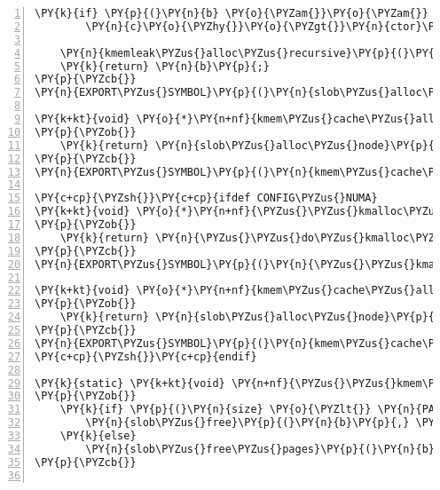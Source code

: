 \begin{Verbatim}[commandchars=\\\{\},numbers=left,firstnumber=1,stepnumber=1]
	\PY{k}{if} \PY{p}{(}\PY{n}{b} \PY{o}{\PYZam{}}\PY{o}{\PYZam{}} \PY{n}{c}\PY{o}{\PYZhy{}}\PY{o}{\PYZgt{}}\PY{n}{ctor}\PY{p}{)}
		\PY{n}{c}\PY{o}{\PYZhy{}}\PY{o}{\PYZgt{}}\PY{n}{ctor}\PY{p}{(}\PY{n}{b}\PY{p}{)}\PY{p}{;}

	\PY{n}{kmemleak\PYZus{}alloc\PYZus{}recursive}\PY{p}{(}\PY{n}{b}\PY{p}{,} \PY{n}{c}\PY{o}{\PYZhy{}}\PY{o}{\PYZgt{}}\PY{n}{size}\PY{p}{,} \PY{l+m+mi}{1}\PY{p}{,} \PY{n}{c}\PY{o}{\PYZhy{}}\PY{o}{\PYZgt{}}\PY{n}{flags}\PY{p}{,} \PY{n}{flags}\PY{p}{)}\PY{p}{;}
	\PY{k}{return} \PY{n}{b}\PY{p}{;}
\PY{p}{\PYZcb{}}
\PY{n}{EXPORT\PYZus{}SYMBOL}\PY{p}{(}\PY{n}{slob\PYZus{}alloc\PYZus{}node}\PY{p}{)}\PY{p}{;}

\PY{k+kt}{void} \PY{o}{*}\PY{n+nf}{kmem\PYZus{}cache\PYZus{}alloc}\PY{p}{(}\PY{k}{struct} \PY{n}{kmem\PYZus{}cache} \PY{o}{*}\PY{n}{cachep}\PY{p}{,} \PY{k+kt}{gfp\PYZus{}t} \PY{n}{flags}\PY{p}{)}
\PY{p}{\PYZob{}}
	\PY{k}{return} \PY{n}{slob\PYZus{}alloc\PYZus{}node}\PY{p}{(}\PY{n}{cachep}\PY{p}{,} \PY{n}{flags}\PY{p}{,} \PY{n}{NUMA\PYZus{}NO\PYZus{}NODE}\PY{p}{)}\PY{p}{;}
\PY{p}{\PYZcb{}}
\PY{n}{EXPORT\PYZus{}SYMBOL}\PY{p}{(}\PY{n}{kmem\PYZus{}cache\PYZus{}alloc}\PY{p}{)}\PY{p}{;}

\PY{c+cp}{\PYZsh{}}\PY{c+cp}{ifdef CONFIG\PYZus{}NUMA}
\PY{k+kt}{void} \PY{o}{*}\PY{n+nf}{\PYZus{}\PYZus{}kmalloc\PYZus{}node}\PY{p}{(}\PY{k+kt}{size\PYZus{}t} \PY{n}{size}\PY{p}{,} \PY{k+kt}{gfp\PYZus{}t} \PY{n}{gfp}\PY{p}{,} \PY{k+kt}{int} \PY{n}{node}\PY{p}{)}
\PY{p}{\PYZob{}}
	\PY{k}{return} \PY{n}{\PYZus{}\PYZus{}do\PYZus{}kmalloc\PYZus{}node}\PY{p}{(}\PY{n}{size}\PY{p}{,} \PY{n}{gfp}\PY{p}{,} \PY{n}{node}\PY{p}{,} \PY{n}{\PYZus{}RET\PYZus{}IP\PYZus{}}\PY{p}{)}\PY{p}{;}
\PY{p}{\PYZcb{}}
\PY{n}{EXPORT\PYZus{}SYMBOL}\PY{p}{(}\PY{n}{\PYZus{}\PYZus{}kmalloc\PYZus{}node}\PY{p}{)}\PY{p}{;}

\PY{k+kt}{void} \PY{o}{*}\PY{n+nf}{kmem\PYZus{}cache\PYZus{}alloc\PYZus{}node}\PY{p}{(}\PY{k}{struct} \PY{n}{kmem\PYZus{}cache} \PY{o}{*}\PY{n}{cachep}\PY{p}{,} \PY{k+kt}{gfp\PYZus{}t} \PY{n}{gfp}\PY{p}{,} \PY{k+kt}{int} \PY{n}{node}\PY{p}{)}
\PY{p}{\PYZob{}}
	\PY{k}{return} \PY{n}{slob\PYZus{}alloc\PYZus{}node}\PY{p}{(}\PY{n}{cachep}\PY{p}{,} \PY{n}{gfp}\PY{p}{,} \PY{n}{node}\PY{p}{)}\PY{p}{;}
\PY{p}{\PYZcb{}}
\PY{n}{EXPORT\PYZus{}SYMBOL}\PY{p}{(}\PY{n}{kmem\PYZus{}cache\PYZus{}alloc\PYZus{}node}\PY{p}{)}\PY{p}{;}
\PY{c+cp}{\PYZsh{}}\PY{c+cp}{endif}

\PY{k}{static} \PY{k+kt}{void} \PY{n+nf}{\PYZus{}\PYZus{}kmem\PYZus{}cache\PYZus{}free}\PY{p}{(}\PY{k+kt}{void} \PY{o}{*}\PY{n}{b}\PY{p}{,} \PY{k+kt}{int} \PY{n}{size}\PY{p}{)}
\PY{p}{\PYZob{}}
	\PY{k}{if} \PY{p}{(}\PY{n}{size} \PY{o}{\PYZlt{}} \PY{n}{PAGE\PYZus{}SIZE}\PY{p}{)}
		\PY{n}{slob\PYZus{}free}\PY{p}{(}\PY{n}{b}\PY{p}{,} \PY{n}{size}\PY{p}{)}\PY{p}{;}
	\PY{k}{else}
		\PY{n}{slob\PYZus{}free\PYZus{}pages}\PY{p}{(}\PY{n}{b}\PY{p}{,} \PY{n}{get\PYZus{}order}\PY{p}{(}\PY{n}{size}\PY{p}{)}\PY{p}{)}\PY{p}{;}
\PY{p}{\PYZcb{}}


\end{Verbatim}
